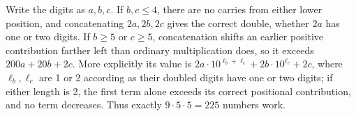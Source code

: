 Write the digits as $ a,b,c $. If $ b,c\le4 $, there are no carries from either lower position, and concatenating $ 2a,2b,2c $ gives the correct double, whether $ 2a $ has one or two digits. If $ b\ge5 $ or $ c\ge5 $, concatenation shifts an earlier positive contribution farther left than ordinary multiplication does, so it exceeds $ 200a+20b+2c $. More explicitly its value is $ 2a\cdot10^{\ell_b+\ell_c}+2b\cdot10^{\ell_c}+2c $, where $\ell_b,\ell_c $ are 1 or 2 according as their doubled digits have one or two digits; if either length is 2, the first term alone exceeds its correct positional contribution, and no term decreases. Thus exactly $ 9\cdot5\cdot5=\boxed{225}$ numbers work.

